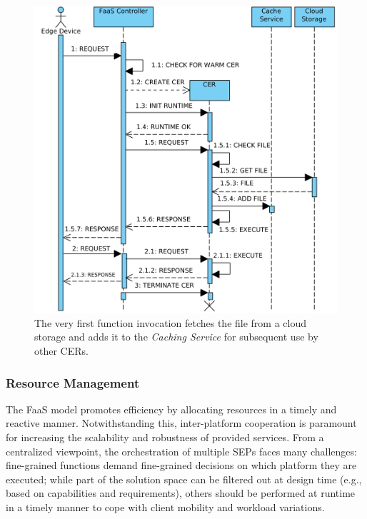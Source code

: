 \begin{figure}[!bp]
	\centering
	\includegraphics[width=1\linewidth]{Figs/CachingService}
	\caption{The very first function invocation fetches the file from a cloud storage and adds it to the \textit{Caching Service} for subsequent use by other CERs.} 
	\label{fig:Mobile_Computation_Offloading_Caching}
\end{figure}


\subsubsection{Resource Management}
The FaaS model promotes efficiency by allocating resources in a timely and reactive manner. Notwithstanding this, inter-platform cooperation is paramount for increasing the scalability and robustness of provided services. 
From a centralized viewpoint, the orchestration of multiple SEPs faces many challenges: fine-grained functions demand fine-grained decisions on which platform they are executed; while part of the solution space can be filtered out at design time (e.g., based on capabilities and requirements), others should be performed at runtime in a timely manner to cope with client mobility and workload variations.

